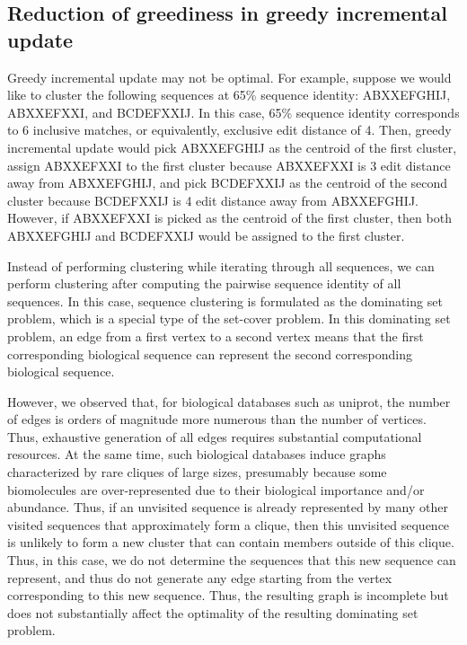 \documentclass[11pt,letterpaper]{article}
\begin{document}
\iffalse

\subsection{Reduction of greediness in greedy incremental update}

Greedy incremental update may not be optimal.
For example, suppose we would like to cluster the following sequences at 65\% sequence identity:
ABXXEFGHIJ, 
ABXXEFXXI, and
BCDEFXXIJ.
In this case, 65\% sequence identity corresponds to 6 inclusive matches, or equivalently, exclusive edit distance of 4.
Then, greedy incremental update would pick ABXXEFGHIJ as the centroid of the first cluster, 
assign ABXXEFXXI to the first cluster because ABXXEFXXI is 3 edit distance away from ABXXEFGHIJ, 
and pick BCDEFXXIJ as the centroid of the second cluster because BCDEFXXIJ is 4 edit distance away from ABXXEFGHIJ.
However, if ABXXEFXXI is picked as the centroid of the first cluster, then both ABXXEFGHIJ and BCDEFXXIJ would be assigned to the first cluster. 

Instead of performing clustering while iterating through all sequences, we can perform clustering after computing the pairwise sequence identity of all sequences. 
In this case, sequence clustering is formulated as the dominating set problem, which is a special type of the set-cover problem. 
In this dominating set problem, an edge from a first vertex to a second vertex means that the first corresponding biological sequence can represent the second corresponding biological sequence. 

However, we observed that, for biological databases such as uniprot, the number of edges is orders of magnitude more numerous than the number of vertices. Thus, exhaustive generation of all edges requires substantial computational resources.
At the same time, such biological databases induce graphs characterized by rare cliques of large sizes, presumably because some biomolecules are over-represented due to their biological importance and/or abundance.
Thus, if an unvisited sequence is already represented by many other visited sequences that approximately form a clique, then this unvisited sequence is unlikely to form a new cluster that can contain members outside of this clique. 
Thus, in this case, we do not determine the sequences that this new sequence can represent, and thus do not generate any edge starting from the vertex corresponding to this new sequence. 
Thus, the resulting graph is incomplete but does not substantially affect the optimality of the resulting dominating set problem.
\end{document}
